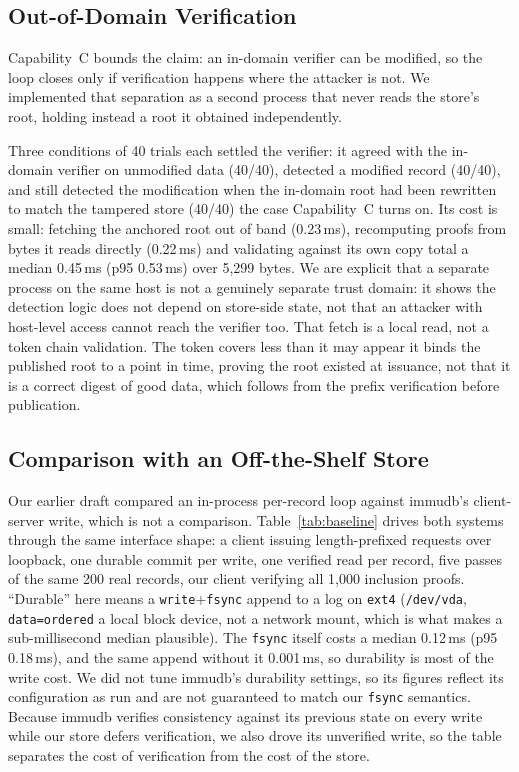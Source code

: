 \documentclass[conference]{IEEEtran}
\begin{document}
\subsection{Out-of-Domain Verification}
\label{sec:ood}
Capability~C bounds the claim: an in-domain verifier can be modified, so the loop closes only if verification
happens where the attacker is not. We implemented that separation as a second process that never reads the
store's root, holding instead a root it obtained independently.

Three conditions of 40 trials each settled the verifier: it agreed with the in-domain verifier on unmodified
data (40/40), detected a modified record (40/40), and still detected the modification when the in-domain root
had been rewritten to match the tampered store (40/40) the case Capability~C turns on. Its cost is small: fetching the anchored root out of band (0.23\,ms),
recomputing proofs from bytes it reads directly (0.22\,ms) and validating against its own copy total a
median 0.45\,ms (p95 0.53\,ms) over 5{,}299 bytes. We are explicit that a
separate process on the same host is not a genuinely separate trust domain: it shows the detection logic does
not depend on store-side state, not that an attacker with host-level access cannot reach the verifier too. That
fetch is a local read, not a token chain validation. The token covers less than it may appear it binds the
published root to a point in time, proving the root existed at issuance, not that it is a correct digest of good
data, which follows from the prefix verification before publication.

\subsection{Comparison with an Off-the-Shelf Store}
\label{sec:baseline}
Our earlier draft compared an in-process per-record loop against immudb's client-server write, which is not a
comparison. Table~\ref{tab:baseline} drives both systems through the same interface shape: a client issuing
length-prefixed requests over loopback, one durable commit per write, one verified read per record, five passes
of the same 200 real records, our client verifying all 1{,}000 inclusion proofs. ``Durable'' here means a
\texttt{write}$+$\texttt{fsync} append to a log on \texttt{ext4} (\texttt{/dev/vda}, \texttt{data=ordered} a
local block device, not a network mount, which is what makes a sub-millisecond median plausible). The
\texttt{fsync} itself costs a median 0.12\,ms (p95 0.18\,ms), and the same append without it 0.001\,ms, so
durability is most of the write cost. We did not tune immudb's durability settings, so its figures reflect its
configuration as run and are not guaranteed to match our \texttt{fsync} semantics. Because immudb verifies
consistency against its previous state on every write while our store defers verification, we also drove its
unverified write, so the table separates the cost of verification from the cost of the store.
\end{document}
